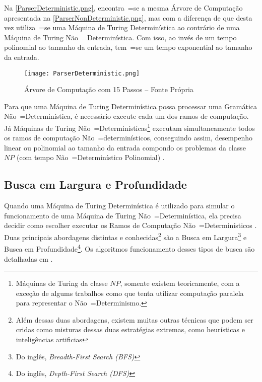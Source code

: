     Na \autoref{ParserDeterministic.png},
    encontra~=se a mesma Árvore de Computação apresentada na \autoref{ParserNonDeterministic.png},
    mas com a diferença de que desta vez utiliza~=se uma Máquina de Turing Determinística ao contrário de uma Máquina de Turing Não~=Determinística.
    Com isso,
    ao invés de um tempo polinomial ao tamanho da entrada,
    tem~=se um tempo exponential ao tamanho da entrada.
    \begin{figure}[h]
    \centering
    \texttt{[image: ParserDeterministic.png]}
    \caption[Árvore de Computação com 15 Passos]{Árvore de Computação com 15 Passos -- Fonte Própria}
    \label{ParserDeterministic.png}
    \end{figure}

    Para que uma Máquina de Turing Determinística possa processar uma Gramática Não~=Determinística,
    é necessário execute cada um dos ramos de computação.
    Já Máquinas de Turing Não~=Determinísticas\footnote{
    Máquinas de Turing da classe $NP$,
    somente existem teoricamente,
    com a exceção de algums trabalhos como  que tenta utilizar computação paralela para representar o Não~=Determinismo.
    }
    executam simultaneamente todos os ramos de computação Não~=determinísticos,
    conseguindo assim, desempenho linear ou
    polinomial ao tamanho da entrada compondo os problemas da classe $NP$ (com tempo Não~=Determinístico Polinomial) \cite{hopcroftBook}.


\subsection{Busca em Largura e Profundidade}
\label{buscaEmLarguraEProfundidade}

    Quando uma Máquina de Turing Determinística é utilizado para simular o funcionamento de uma Máquina de Turing Não~=Determinística,
    ela precisa decidir como escolher executar os Ramos de Computação Não~=Determinísticos \cite{sipserBook}.
    Duas principais abordagens distintas e
    conhecidas\footnote{
    Além dessas duas abordagens,
    existem muitas outras técnicas que podem ser cridas como misturas dessas duas estratégias extremas,
    como heurísticas e inteligências artificias
    }
    são a Busca em Largura\footnote{
    Do inglês, \textit{Breadth-First Search (BFS)}
    }
    e Busca em Profundidade\footnote{
    Do inglês, \textit{Depth-First Search (DFS)}
    }.
    Os algoritmos funcionamento desses tipos de busca são detalhadas em .

